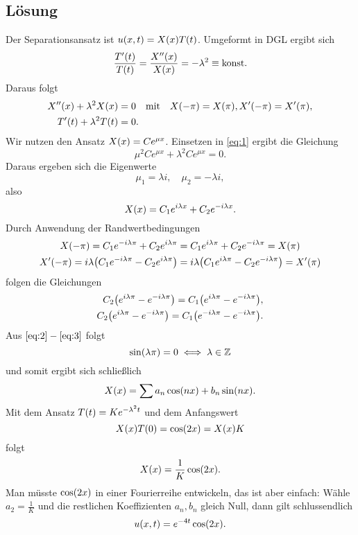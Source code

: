 \documentclass{exercise}
\begin{document}
    \subsection*{Lösung}
    Der Separationsansatz ist \(u\parentheses*{x, t} = X\parentheses*{x}T\parentheses*{t}\). Umgeformt in DGL ergibt sich
    \[
        \frac{T'\parentheses*{t}}{T\parentheses*{t}} = \frac{X''\parentheses*{x}}{X\parentheses*{x}} = -\lambda^2 \equiv \text{konst.}
    \]
    Daraus folgt
    \begin{align}
        X''\parentheses*{x} + \lambda^2 X\parentheses*{x} &= 0 \quad \text{mit} \quad X\parentheses*{-\pi} = X\parentheses*{\pi}, X'\parentheses*{-\pi} = X'\parentheses*{\pi},\label{eq:1}\\
        T'\parentheses*{t} + \lambda^2 T\parentheses*{t} &= 0.\label{eq:2}
    \end{align}
    Wir nutzen den Ansatz \(X\parentheses*{x} = Ce^{\mu x}\).
    Einsetzen in \eqref{eq:1} ergibt die Gleichung
    \[
        \mu^2 Ce^{\mu x} + \lambda^2 Ce^{\mu x} = 0.
    \]
    Daraus ergeben sich die Eigenwerte
    \[
        \mu_1 = \lambda i, \quad \mu_2 = -\lambda i,
    \]
    also
    \[
        X\parentheses*{x} = C_1 e^{i\lambda x} + C_2 e^{-i\lambda x}.
    \]
    Durch Anwendung der Randwertbedingungen
    \begin{align*}
        X\parentheses*{-\pi} = C_1 e^{-i\lambda\pi} + C_2 e^{i\lambda\pi} &= C_1 e^{i\lambda\pi} + C_2 e^{-i\lambda\pi} = X\parentheses*{\pi}\\
        X'\parentheses*{-\pi} = i\lambda\parentheses*{C_1 e^{-i\lambda\pi} - C_2 e^{i\lambda\pi}} &= i\lambda\parentheses*{C_1 e^{i\lambda\pi} - C_2 e^{-i\lambda\pi}} = X'\parentheses*{\pi}
    \end{align*}
    folgen die Gleichungen
    \begin{align}
        C_2\parentheses*{e^{i\lambda\pi} - e^{-i\lambda\pi}} = C_1\parentheses*{e^{i\lambda\pi} - e^{-i\lambda\pi}},\label{eq:2}\\
        C_2\parentheses*{e^{i\lambda\pi} - e^{-i\lambda\pi}} = C_1\parentheses*{e^{-i\lambda\pi} - e^{-i\lambda\pi}}.\label{eq:3}
    \end{align}
    Aus \(\eqref{eq:2} - \eqref{eq:3}\) folgt
    \[
        \sin\parentheses*{\lambda\pi} = 0 \iff \lambda \in \Z
    \]
    und somit ergibt sich schließlich
    \[
        X\parentheses*{x} = \sum a_n\cos\parentheses*{nx} + b_n\sin\parentheses*{nx}.
    \]
    Mit dem Ansatz \(T\parentheses*{t} = Ke^{-\lambda^2 t}\) und dem Anfangswert
    \[
        X\parentheses*{x}T\parentheses*{0} = \cos\parentheses*{2x} = X\parentheses*{x}K
    \]
    folgt
    \[
        X\parentheses*{x} = \frac{1}{K}\cos\parentheses*{2x}.
    \]
    Man müsste \(\cos\parentheses*{2x}\) in einer Fourierreihe entwickeln, das ist aber einfach: Wähle \(a_2 = \frac{1}{K}\) und die restlichen Koeffizienten \(a_n, b_n\) gleich Null, dann gilt schlussendlich
    \[
        u\parentheses*{x, t} = e^{-4t}\cos\parentheses*{2x}.
    \]
\end{document}
